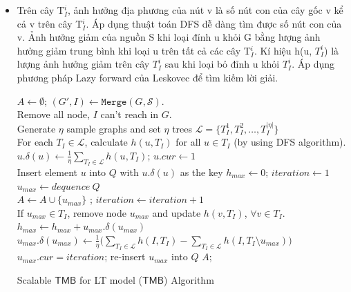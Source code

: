 \begin {itemize}
\begin{figure}[h]
	\caption{Ví dụ tạo ra một cây gốc $I$ từ $G$ trên mô hình LT}
	\label{example}
\end{figure}			
\item Trên cây T$_{I}^i$, ảnh hưởng địa phương của nút v là số nút con của cây gốc v kể cả v trên cây T$_{I}^i$. Áp dụng thuật toán DFS dễ dàng tìm được số nút con của v. Ảnh hưởng giảm của nguồn S khi loại đỉnh u khỏi G bằng lượng ảnh hưởng giảm trung bình khi loại u trên tất cả các cây T$_{I}^i$. Kí hiệu h(u, $T_I^i$) là lượng ảnh hưởng giảm trên cây $T_I^i$ sau khi loại bỏ đỉnh u khỏi $T_I^i$. Áp dụng phương pháp Lazy forward của Leskovec \cite{krause} để tìm kiếm lời giải. 
\begin{algorithm}[h]
	$A \leftarrow \emptyset$;	$(G', I) \leftarrow \mathtt{Merge}(G, \mathcal{S})$.
	\\
	Remove all node, $I$ can't reach in $G$.
	\\
	Generate $\eta$ sample graphs and set $\eta$ trees $\mathcal{L}=\{T_{I}^1, T_{I}^2, \ldots, T_{I}^{|\mathcal{\eta}|}\}$
	\\
	For each $ T_{I} \in \mathcal{L}$, calculate $h(u, T_{I})$ for all $u \in T_{I}$ (by using DFS algorithm).
	\\
	{
		$u.\delta(u) \leftarrow \frac{1}{\eta}\sum_{T_{I} \in \mathcal{L}} h(u, T_{I})$; $u. cur \leftarrow 1$
		\\
		Insert element $u$ into $Q$ with $u.\delta(u)$ as the key
	}
	$ h_{max} \leftarrow 0$; $iteration \leftarrow 1$
	\\
	{
		$u_{max} \leftarrow  dequence \  Q$
		\\
		{
			$A \leftarrow A \cup \{u_{max}\}$ ; $iteration \leftarrow iteration+1 $
			\\
			{
				If $u_{max} \in T_{I}$, remove node $u_{max}$ and update $h(v, T_{I})$, $ \forall v \in T_{I}$.
			}
			$h_{max} \leftarrow h_{max}+ u_{max}.\delta(u_{max})$
		}
		{
			$u_{max}. \delta(u_{max}) \leftarrow  \frac{1}{\eta}\big(\sum_{T_{I} \in \mathcal{L}}h(I, T_{I}) - \sum_{T_{I} \in \mathcal{L}} h(I, T_{I} \setminus u_{max})\big)$
			\\
			$u_{max}. cur =iteration$; re-insert $u_{max}$ into $Q$
		}
	}
	\Return $A$;
	\caption{Scalable $\mathsf{TMB}$ for LT model ($\mathsf{TMB}$) Algorithm}
	\label{STMB}
\end{algorithm}				
\end {itemize}
